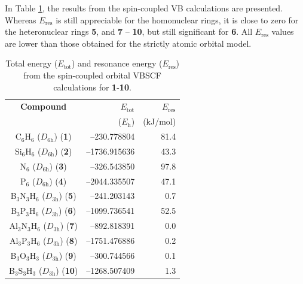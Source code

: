 In Table \ref{ch6.table3}, the results from the spin-coupled VB calculations
are presented. Whereas $E_{\mathrm{res}}$ is still appreciable for 
the homonuclear rings, it is close to zero for the heteronuclear rings \textbf{5},
and \textbf{7} -- \textbf{10}, but still significant for \textbf{6}.
All $E_\mathrm{res}$ values are lower than those obtained for the strictly atomic orbital model. 

\begin{table}[ht]
\caption{Total energy ($E_\mathrm{tot}$) and resonance energy ($E_\mathrm{res}$) from the spin-coupled orbital VBSCF calculations for \textbf{1}-\textbf{10}.}
\begin{center}
\begin{tabular}{ c r r }
\hline
\textbf{Compound}&
$E_{\mathrm{tot}}$&
$E_{\mathrm{res}}$\\
&($E_{\mathrm{h}}$)&(kJ/mol)\\
\hline
C$_6$H$_6$ ($D_\mathrm{6h}$) (\textbf{1})& --230.778804&81.4\\
Si$_6$H$_6$ ($D_\mathrm{6h}$) (\textbf{2})& --1736.915636&43.3\\
N$_6$ ($D_\mathrm{6h}$) (\textbf{3})& --326.543850&97.8\\
P$_6$ ($D_\mathrm{6h}$) (\textbf{4})& --2044.335507&47.1\\
B$_3$N$_3$H$_6$ ($D_\mathrm{3h}$) (\textbf{5})& --241.203143&0.7\\
B$_3$P$_3$H$_6$ ($D_\mathrm{3h}$) (\textbf{6})& --1099.736541&52.5\\
Al$_3$N$_3$H$_6$ ($D_\mathrm{3h}$) (\textbf{7})& --892.818391&0.0\\
Al$_3$P$_3$H$_6$ ($D_\mathrm{3h}$) (\textbf{8})&--1751.476886&0.2\\
B$_3$O$_3$H$_3$ ($D_\mathrm{3h}$) (\textbf{9})& --300.744566&0.1\\
B$_3$S$_3$H$_3$ ($D_\mathrm{3h}$) (\textbf{10})& --1268.507409&1.3\\
\end{tabular}
\label{ch6.table3}
\end{center}
\end{table}

